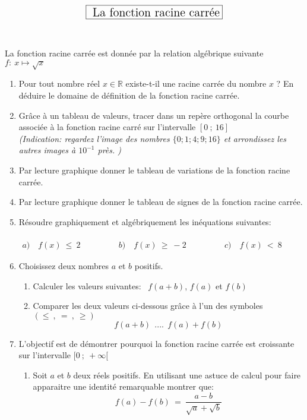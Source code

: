 \documentclass[a4paper,10pt]{article}
\newcommand{\R}{\mathbb{R}}
\begin{document}
\newpage$$\fbox{\text{\Large{ La fonction racine carrée}}}$$
\hfill\\\hfil\\
\noindent La fonction racine carrée est donnée par la relation algébrique suivante \quad
$f:~x \longmapsto \sqrt{x}$\\
\begin{enumerate}
	\item Pour tout nombre réel $x\in\R$ existe-t-il une racine carrée du nombre $x$ ? En déduire le domaine de définition de la fonction racine carrée. \\
	\item Grâce à un tableau de valeurs, tracer dans un repère orthogonal la courbe associée à la fonction racine carré sur l'intervalle $[0~;~16]$ \\
	\textit{(Indication: regardez l'image des nombres $\{0;1;4;9;16\}$ et arrondissez les autres images à $10^{-1}$ près. )}\\ 
	\item Par lecture graphique donner le tableau de variations de la fonction racine carrée.\\   
	\item Par lecture graphique donner le tableau de signes de la fonction racine carrée.\\
	\item Résoudre graphiquement et  algébriquement les inéquations suivantes:\\\\
	$\begin{array}{lclcl}
	a)\quad f(x) \ \leq \ 2
	&\quad\quad\quad&b)\quad f(x) \ \geq \ -2&\quad\quad\quad&  
	c)\quad f(x) \ < \ 8
	
\end{array}$\\
\item Choisissez deux nombres $a$ et $b$ positifs.
\begin{enumerate}
\item Calculer les valeurs suivantes:~
$f(a+b)$, $f(a)$ et $f(b)$\\
\item Comparer les deux valeurs ci-dessous grâce à l'un des symboles $(\leq~,~= ~,~\geq)$
$$f(a+b)~~....~~f(a)+f(b)$$
\end{enumerate}


\item  L'objectif est de démontrer pourquoi la fonction racine carrée est croissante sur l'intervalle $[0~;~+\infty[$\\
\begin{enumerate} 
	\item Soit $a$ et $b$ deux réels positifs. En utilisant une astuce de calcul pour faire apparaitre une identité remarquable montrer que: $$f(a)-f(b) \ = \ \dfrac{a - b}{\sqrt{a}+\sqrt{b}}$$ 
	

\end{enumerate}
\end{enumerate}
\end{document}
